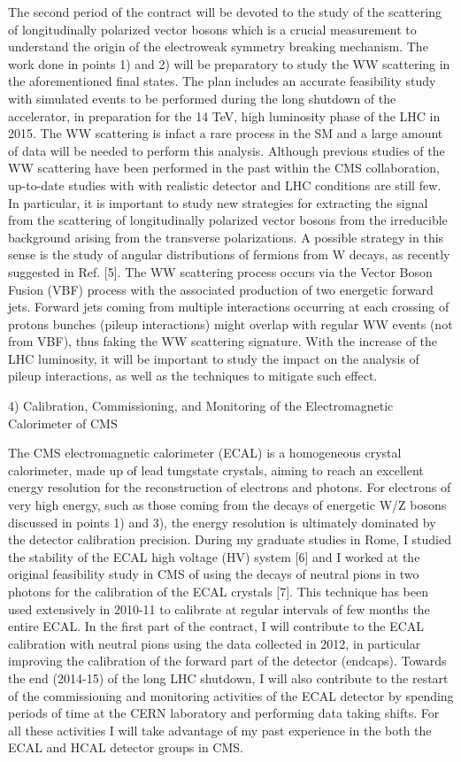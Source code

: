\documentclass[10pt, a4paper]{article}
\begin{document}
The second period of the contract will be devoted to the study of the scattering of longitudinally polarized vector bosons which is a crucial measurement to understand the origin of the electroweak symmetry breaking mechanism. 
The work done in points 1) and 2) will be preparatory to study the WW scattering in the aforementioned final states. The plan includes an accurate feasibility study with simulated events to be performed during the long shutdown of the accelerator, in preparation for the 14 TeV, high luminosity phase of the LHC in 2015. The WW scattering is infact a rare process in the SM and a large amount of data will be needed to perform this analysis. Although previous studies of the WW scattering have been performed in the past within the CMS collaboration, up-to-date studies with with realistic detector and LHC conditions are still few. In particular, it is important to study new strategies for extracting the signal from the scattering of longitudinally polarized vector bosons from the irreducible background arising from the transverse polarizations. A possible strategy in this sense is the study of angular distributions of fermions from W decays, as recently suggested in Ref. [5].
The WW scattering process occurs via the Vector Boson Fusion (VBF) process with the associated production of two energetic forward jets. Forward jets coming from multiple interactions occurring at each crossing of protons bunches 
(pileup interactions) might overlap with regular WW events (not from VBF), thus faking the WW scattering signature. With the increase of the LHC luminosity, it will be important to study the impact on the analysis of pileup interactions, as well as the techniques to mitigate such effect.

4) Calibration, Commissioning, and Monitoring of the Electromagnetic Calorimeter of CMS

The CMS electromagnetic calorimeter (ECAL) is a homogeneous crystal calorimeter, made up of lead tungstate crystals, aiming to reach an excellent energy resolution for the reconstruction of electrons and photons. For electrons of very high energy, such as those coming from the decays of energetic W/Z bosons discussed in points 1) and 3), 
the energy resolution is ultimately dominated by the detector calibration precision. 
During my graduate studies in Rome, I studied the stability of the ECAL high voltage (HV) system [6] and I worked at the original feasibility study in CMS of using the decays of neutral pions in two photons for the calibration of the ECAL crystals [7].  This technique has been used extensively in 2010-11 to calibrate at regular intervals of few months the entire ECAL.
In the first part of the contract, I will contribute to the ECAL calibration with neutral pions using the data collected in 2012, in particular improving the calibration of the forward part of the detector (endcaps). 
Towards the end (2014-15) of the long LHC shutdown, I will also contribute to the restart of the commissioning and monitoring activities of the ECAL detector by spending periods of time at the CERN laboratory and performing data taking shifts. For all these activities I will take advantage of my past experience in the both the ECAL and HCAL detector groups in CMS.
\end{document}
